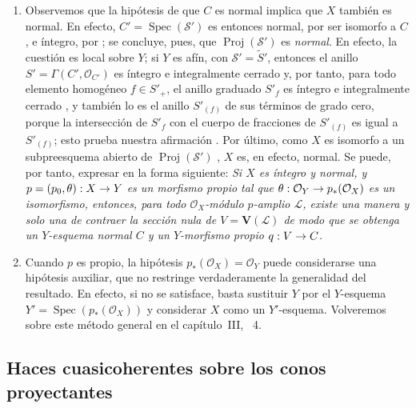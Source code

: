 \documentclass[oneside,10pt]{amsart}
\makeatletter
\newcommand{\ega@arrow}[2]{\mathchoice{#1}{#2}{#2}{#2}}
\renewcommand{\to}{\ega@arrow{\longrightarrow}{\rightarrow}}
\let\EGAOriginalLabel\label
\renewcommand{\label}[1]{\phantomsection\EGAOriginalLabel{#1}}
\makeatother
\begin{document}
\begin{remark}[8.11.8]
\label{II.8.11.8-fr}
\begin{enumerate}
    \item[\rm{(i)}] Observemos que la hipótesis de que $C$ es normal implica que $X$ también es normal.
        En efecto, $C'=\operatorname{Spec}(\mathcal{S}')$ es entonces normal, por ser isomorfo a $C$, e íntegro, por ;
        se concluye, pues, que $\operatorname{Proj}(\mathcal{S}')$ es \emph{normal}.
        En efecto, la cuestión es local sobre $Y$;
        si $Y$ es afín, con $\mathcal{S}'=\widetilde{S}'$, entonces el anillo $S'=\Gamma(C',\mathcal{O}_{C'})$ es íntegro e integralmente cerrado  y, por tanto, para todo elemento homogéneo $f\in S'_+$, el anillo graduado $S'_f$ es íntegro e integralmente cerrado \cite[t.~I, p.~257 y 261]{I-13}, y también lo es el anillo $S'_{(f)}$ de sus términos de grado cero, porque la intersección de $S'_f$ con el cuerpo de fracciones de $S'_{(f)}$ es igual a $S'_{(f)}$;
        esto prueba nuestra afirmación .
        Por último, como $X$ es isomorfo a un subpreesquema abierto de $\operatorname{Proj}(\mathcal{S}')$ , $X$ es, en efecto, normal.
        Se puede, por tanto, expresar  en la forma siguiente:
        \emph{Si $X$ es íntegro y normal, y $p=(p_0,\theta):X\to Y$ es un morfismo propio tal que $\theta:\mathcal{O}_Y\to p_*(\mathcal{O}_X)$ es un isomorfismo, entonces, para todo $\mathcal{O}_X$-módulo $p$-amplio $\mathcal{L}$, existe una manera y solo una de contraer la sección nula de $V=\mathbf{V}(\mathcal{L})$ de modo que se obtenga un $Y$-esquema normal $C$ y un $Y$-morfismo propio $q:V\to C$.}
    \item[\rm{(ii)}] Cuando $p$ es propio, la hipótesis $p_*(\mathcal{O}_X)=\mathcal{O}_Y$ puede considerarse una hipótesis auxiliar, que no restringe verdaderamente la generalidad del resultado.
        En efecto, si no se satisface, basta sustituir $Y$ por el $Y$-esquema $Y'=\operatorname{Spec}(p_*(\mathcal{O}_X))$ y considerar $X$ como un $Y'$-esquema.
        Volveremos sobre este método general en el capítulo~III, \textsection~4.
\end{enumerate}
\end{remark}


\subsection{Haces cuasicoherentes sobre los conos proyectantes}
\label{subsection:II.8.12-fr}
\end{document}

